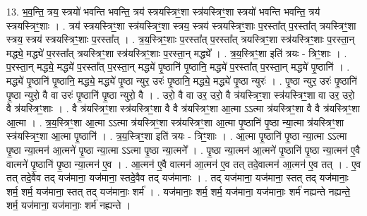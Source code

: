 \documentclass[17pt]{extarticle}
\begin{document}
13. भ॒व॒न्ति॒ त्रय॒ स्त्रयो॑ भवन्ति भवन्ति॒ त्रय॑ स्त्रयस्त्रिꣳ॒॒शा स्त्र॑यस्त्रिꣳ॒॒शा स्त्रयो॑ भवन्ति भवन्ति॒ त्रय॑ स्त्रयस्त्रिꣳ॒॒शाः । . त्रय॑ स्त्रयस्त्रिꣳ॒॒शा स्त्र॑यस्त्रिꣳ॒॒शा स्त्रय॒ स्त्रय॑ स्त्रयस्त्रिꣳ॒॒शाः प॒रस्ता᳚त् प॒रस्ता᳚त् त्रयस्त्रिꣳ॒॒शा स्त्रय॒ स्त्रय॑ स्त्रयस्त्रिꣳ॒॒शाः प॒रस्ता᳚त् । . त्र॒य॒स्त्रिꣳ॒॒शाः प॒रस्ता᳚त् प॒रस्ता᳚त् त्रयस्त्रिꣳ॒॒शा स्त्र॑यस्त्रिꣳ॒॒शाः प॒रस्ता॒न् मद्ध्ये॒ मद्ध्ये॑ प॒रस्ता᳚त् त्रयस्त्रिꣳ॒॒शा स्त्र॑यस्त्रिꣳ॒॒शाः प॒रस्ता॒न् मद्ध्ये᳚ । . त्र॒य॒स्त्रिꣳ॒॒शा इति॑ त्रयः - त्रिꣳ॒॒शाः । . प॒रस्ता॒न् मद्ध्ये॒ मद्ध्ये॑ प॒रस्ता᳚त् प॒रस्ता॒न् मद्ध्ये॑ पृ॒ष्ठानि॑ पृ॒ष्ठानि॒ मद्ध्ये॑ प॒रस्ता᳚त् प॒रस्ता॒न् मद्ध्ये॑ पृ॒ष्ठानि॑ । . मद्ध्ये॑ पृ॒ष्ठानि॑ पृ॒ष्ठानि॒ मद्ध्ये॒ मद्ध्ये॑ पृ॒ष्ठा न्युर॒ उरः॑ पृ॒ष्ठानि॒ मद्ध्ये॒ मद्ध्ये॑ पृ॒ष्ठा न्युरः॑ । . पृ॒ष्ठा न्युर॒ उरः॑ पृ॒ष्ठानि॑ पृ॒ष्ठा न्युरो॒ वै वा उरः॑ पृ॒ष्ठानि॑ पृ॒ष्ठा न्युरो॒ वै । . उरो॒ वै वा उर॒ उरो॒ वै त्र॑यस्त्रिꣳ॒॒शा स्त्र॑यस्त्रिꣳ॒॒शा वा उर॒ उरो॒ वै त्र॑यस्त्रिꣳ॒॒शाः । . वै त्र॑यस्त्रिꣳ॒॒शा स्त्र॑यस्त्रिꣳ॒॒शा वै वै त्र॑यस्त्रिꣳ॒॒शा आ॒त्मा ऽऽत्मा त्र॑यस्त्रिꣳ॒॒शा वै वै त्र॑यस्त्रिꣳ॒॒शा आ॒त्मा । . त्र॒य॒स्त्रिꣳ॒॒शा आ॒त्मा ऽऽत्मा त्र॑यस्त्रिꣳ॒॒शा स्त्र॑यस्त्रिꣳ॒॒शा आ॒त्मा पृ॒ष्ठानि॑ पृ॒ष्ठा न्या॒त्मा त्र॑यस्त्रिꣳ॒॒शा स्त्र॑यस्त्रिꣳ॒॒शा आ॒त्मा पृ॒ष्ठानि॑ । . त्र॒य॒स्त्रिꣳ॒॒शा इति॑ त्रयः - त्रिꣳ॒॒शाः । . आ॒त्मा पृ॒ष्ठानि॑ पृ॒ष्ठा न्या॒त्मा ऽऽत्मा पृ॒ष्ठा न्या॒त्मन॑ आ॒त्मने॑ पृ॒ष्ठा न्या॒त्मा ऽऽत्मा पृ॒ष्ठा न्या॒त्मने᳚ । . पृ॒ष्ठा न्या॒त्मन॑ आ॒त्मने॑ पृ॒ष्ठानि॑ पृ॒ष्ठा न्या॒त्मन॑ ए॒वै वात्मने॑ पृ॒ष्ठानि॑ पृ॒ष्ठा न्या॒त्मन॑ ए॒व । . आ॒त्मन॑ ए॒वै वात्मन॑ आ॒त्मन॑ ए॒व तत् तदे॒वात्मन॑ आ॒त्मन॑ ए॒व तत् । . ए॒व तत् तदे॒वैव तद् यज॑माना॒ यज॑माना॒ स्तदे॒वैव तद् यज॑मानाः । . तद् यज॑माना॒ यज॑माना॒ स्तत् तद् यज॑मानाः॒ शर्म॒ शर्म॒ यज॑माना॒ स्तत् तद् यज॑मानाः॒ शर्म॑ । . यज॑मानाः॒ शर्म॒ शर्म॒ यज॑माना॒ यज॑मानाः॒ शर्म॑ नह्यन्ते नह्यन्ते॒ शर्म॒ यज॑माना॒ यज॑मानाः॒ शर्म॑ नह्यन्ते । \newline
\end{document}
